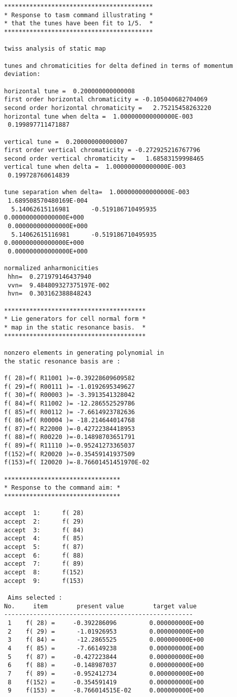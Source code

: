 \begin{footnotesize}
\begin{verbatim}
*****************************************
* Response to tasm command illustrating *
* that the tunes have been fit to 1/5.  *
*****************************************

twiss analysis of static map

tunes and chromaticities for delta defined in terms of momentum deviation:

horizontal tune =  0.200000000000008
first order horizontal chromaticity = -0.105040682704069
second order horizontal chromaticity =   2.75215458263220
horizontal tune when delta =  1.000000000000000E-003
 0.199897711471887

vertical tune =  0.200000000000007
first order vertical chromaticity = -0.272925216767796
second order vertical chromaticity =   1.68583159998465
vertical tune when delta =  1.000000000000000E-003
 0.199728760614839

tune separation when delta=  1.000000000000000E-003
 1.689508570480169E-004
  5.14062615116981      -0.519186710495935       0.000000000000000E+000
 0.000000000000000E+000
  5.14062615116981      -0.519186710495935       0.000000000000000E+000
 0.000000000000000E+000

normalized anharmonicities
 hhn=  0.271979146437940
 vvn=  9.484809327375197E-002
 hvn=  0.303162388848243

***************************************
* Lie generators for cell normal form *
* map in the static resonance basis.  *
***************************************

nonzero elements in generating polynomial in
the static resonance basis are :

f( 28)=f( R11001 )=-0.39228609609582
f( 29)=f( R00111 )= -1.0192695349627
f( 30)=f( R00003 )= -3.3913541328042
f( 84)=f( R11002 )= -12.286552529786
f( 85)=f( R00112 )= -7.6614923782636
f( 86)=f( R00004 )= -18.214644014768
f( 87)=f( R22000 )=-0.42722384418953
f( 88)=f( R00220 )=-0.14898703651791
f( 89)=f( R11110 )=-0.95241273365037
f(152)=f( R20020 )=-0.35459141937509
f(153)=f( I20020 )=-8.76601451451970E-02

********************************
* Response to the command aim: *
********************************

accept  1:      f( 28)
accept  2:      f( 29)
accept  3:      f( 84)
accept  4:      f( 85)
accept  5:      f( 87)
accept  6:      f( 88)
accept  7:      f( 89)
accept  8:      f(152)
accept  9:      f(153)

 Aims selected :
No.     item        present value        target value
----------------------------------------------------
 1    f( 28) =     -0.392286096         0.000000000E+00
 2    f( 29) =      -1.01926953         0.000000000E+00
 3    f( 84) =      -12.2865525         0.000000000E+00
 4    f( 85) =      -7.66149238         0.000000000E+00
 5    f( 87) =     -0.427223844         0.000000000E+00
 6    f( 88) =     -0.148987037         0.000000000E+00
 7    f( 89) =     -0.952412734         0.000000000E+00
 8    f(152) =     -0.354591419         0.000000000E+00
 9    f(153) =     -8.766014515E-02     0.000000000E+00


\end{verbatim}
\end{footnotesize}
